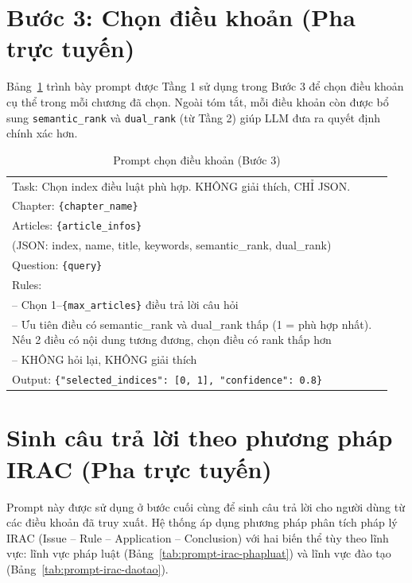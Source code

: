 \section{Bước 3: Chọn điều khoản (Pha trực tuyến)}
\label{sec:app-prompt-loop2}

Bảng~\ref{tab:prompt-loop2} trình bày prompt được Tầng 1 sử dụng trong Bước 3 để chọn điều khoản cụ thể trong mỗi
chương đã chọn. Ngoài tóm tắt, mỗi điều khoản còn được bổ sung \texttt{semantic\_rank} và
\texttt{dual\_rank} (từ Tầng 2) giúp LLM đưa ra quyết định chính xác hơn.

\begin{table}[htbp]
  \centering
  \caption{Prompt chọn điều khoản (Bước 3)}
  \label{tab:prompt-loop2}
  \begin{tabular}{p{0.95\linewidth}}
    \toprule
    Task: Chọn index điều luật phù hợp. KHÔNG giải thích, CHỈ JSON. \\[6pt]
    Chapter: \texttt{\{chapter\_name\}} \\
    Articles: \texttt{\{article\_infos\}} \\
    (JSON: index, name, title, keywords, semantic\_rank, dual\_rank) \\[6pt]
    Question: \texttt{\{query\}} \\[6pt]
    Rules: \\
    -- Chọn 1--\texttt{\{max\_articles\}} điều trả lời câu hỏi \\
    -- Ưu tiên điều có semantic\_rank và dual\_rank thấp (1 = phù hợp nhất). Nếu 2
    điều có nội dung tương đương, chọn điều có rank thấp hơn \\
    -- KHÔNG hỏi lại, KHÔNG giải thích \\[6pt]
    Output: \texttt{\{"selected\_indices": [0, 1], "confidence": 0.8\}} \\
    \bottomrule
  \end{tabular}
\end{table}

\section{Sinh câu trả lời theo phương pháp IRAC (Pha trực tuyến)}
\label{sec:app-prompt-irac}

Prompt này được sử dụng ở bước cuối cùng để sinh câu trả lời cho người dùng từ các
điều khoản đã truy xuất. Hệ thống áp dụng phương pháp phân tích pháp lý IRAC (Issue
-- Rule -- Application -- Conclusion) với hai biến thể tùy theo lĩnh vực: lĩnh vực pháp luật
(Bảng~\ref{tab:prompt-irac-phapluat}) và lĩnh vực đào tạo (Bảng~\ref{tab:prompt-irac-daotao}).

